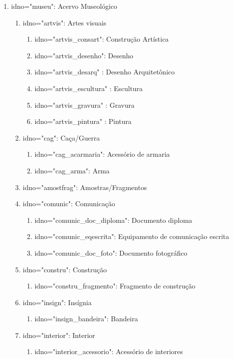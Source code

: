 \begin{enumerate}
	\item idno="museu": Acervo Museológico
	\begin{enumerate}
		\item idno="artvis": Artes visuais
		\begin{enumerate}
			\item idno="artvis\_consart": Construção Artística
			\item idno="artvis\_desenho": Desenho
			\item idno="artvis\_desarq" : Desenho Arquitetônico
			\item idno="artvis\_escultura" : Escultura
			\item idno="artvis\_gravura" : Gravura
			\item idno="artvis\_pintura" : Pintura
		\end{enumerate}
	   \item idno="cag": Caça/Guerra
	   \begin{enumerate}
	   	\item idno="cag\_acarmaria": Acessório de armaria
	   	\item idno="cag\_arma": Arma
	   \end{enumerate}
	   \item idno="amostfrag": Amostras/Fragmentos
	   \item idno="comunic": Comunicação
	   \begin{enumerate}
	   	\item idno="comunic\_doc\_diploma": Documento diploma
	   	\item idno="comunic\_eqescrita": Equipamento de comunicação escrita
	   	\item idno="comunic\_doc\_foto": Documento fotográfico
	   \end{enumerate}
	   \item idno="constru": Construção
	   \begin{enumerate}
	   	\item idno="constru\_fragmento": Fragmento de construção
	   \end{enumerate}
	   \item idno="insign": Insígnia
	   \begin{enumerate}
	   	\item idno="insign\_bandeira": Bandeira
	   \end{enumerate}
	   \item idno="interior": Interior
	   \begin{enumerate}
	   	\item idno="interior\_acessorio": Acessório de interiores

\end{enumerate}
\end{enumerate}
\end{enumerate}
